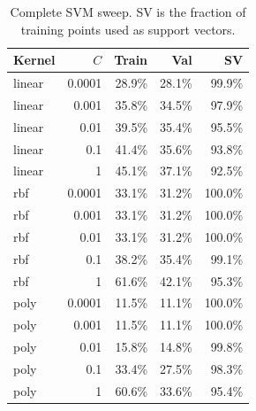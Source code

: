 \begin{table}[ht]\centering\small
\caption{Complete SVM sweep. SV is the fraction of training points used as support vectors.}\label{tab:svm}
\begin{tabular}{lrrrr}
\toprule
Kernel & $C$ & Train & Val & SV\\
\midrule
linear & 0.0001 & 28.9\% & 28.1\% & 99.9\%\\
linear & 0.001 & 35.8\% & 34.5\% & 97.9\%\\
linear & 0.01 & 39.5\% & 35.4\% & 95.5\%\\
linear & 0.1 & 41.4\% & 35.6\% & 93.8\%\\
linear & 1 & 45.1\% & 37.1\% & 92.5\%\\
rbf & 0.0001 & 33.1\% & 31.2\% & 100.0\%\\
rbf & 0.001 & 33.1\% & 31.2\% & 100.0\%\\
rbf & 0.01 & 33.1\% & 31.2\% & 100.0\%\\
rbf & 0.1 & 38.2\% & 35.4\% & 99.1\%\\
rbf & 1 & 61.6\% & 42.1\% & 95.3\%\\
poly & 0.0001 & 11.5\% & 11.1\% & 100.0\%\\
poly & 0.001 & 11.5\% & 11.1\% & 100.0\%\\
poly & 0.01 & 15.8\% & 14.8\% & 99.8\%\\
poly & 0.1 & 33.4\% & 27.5\% & 98.3\%\\
poly & 1 & 60.6\% & 33.6\% & 95.4\%\\
\bottomrule\end{tabular}
\end{table}